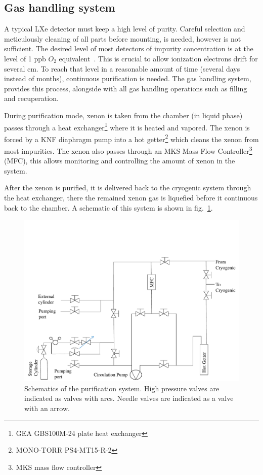 \subsection{Gas handling system }
\label{subsec:gas}

A typical LXe detector must keep a high level of purity. Careful selection and meticulously cleaning of all parts before mounting, 
is needed, however is not sufficient. The desired level of most detectors of impurity concentration is at the level of 1 ppb $O_2$ 
equivalent~\cite{Aprile:2009dv}. This is crucial to allow ionization electrons drift for several cm. To reach that level in a 
reasonable amount of time (several days instead of months), continuous purification is needed. The gas handling system, provides this process, 
alongside with all gas handling operations such as filling and recuperation.

During purification mode, xenon is taken from the chamber (in liquid phase)
passes through a heat exchanger\footnote{GEA GBS100M-24 plate heat exchanger} where it is heated and vapored. The xenon is forced 
by a KNF diaphragm pump into a hot getter\footnote{MONO-TORR
PS4-MT15-R-2} which cleans the xenon from most impurities. The xenon
also passes through an MKS Mass Flow Controller\footnote{MKS mass flow controller} (MFC), this allows monitoring and controlling the amount of xenon in the system. 

After the xenon is purified, it is delivered back to the cryogenic system through the heat exchanger, there the remained xenon gas is 
liquefied before it continuous back to the chamber. A schematic of this system is shown in fig.~\ref{fig:gasSchematic}.


\begin{figure}[t!]
\centerline{\includegraphics[width=1.\linewidth]{GasSchematics.pdf}}
\caption{Schematics of the purification system. High pressure valves are indicated as valves with arcs. Needle valves are indicated as 
a valve with an arrow.}
\label{fig:gasSchematic}
\end{figure}

